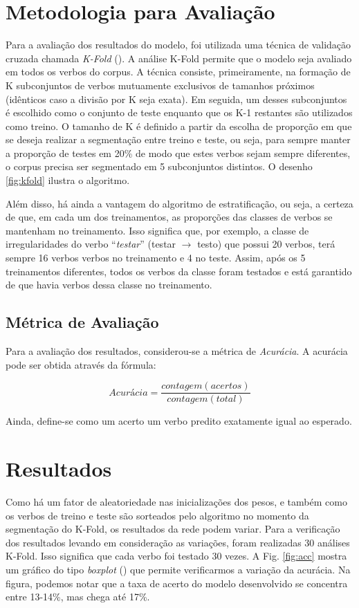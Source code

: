 \section{Metodologia para Avaliação}
\label{sec:method}

 Para a avaliação dos resultados do modelo, foi utilizada uma técnica de validação cruzada chamada \textit{K-Fold} (\cite{kfold:2018}). A análise K-Fold permite que o modelo seja avaliado em todos os verbos do corpus. A técnica consiste, primeiramente, na formação de K subconjuntos de verbos mutuamente exclusivos de tamanhos próximos (idênticos caso a divisão por K seja exata). Em seguida, um desses subconjuntos é escolhido como o conjunto de teste enquanto que os K-1 restantes são utilizados como treino. O tamanho de K é definido a partir da escolha de proporção em que se deseja realizar a segmentação entre treino e teste, ou seja, para sempre manter a proporção de testes em 20\% de modo que estes verbos sejam sempre diferentes, o corpus precisa ser segmentado em 5 subconjuntos distintos. O desenho \ref{fig:kfold} ilustra o algoritmo. 



Além disso, há ainda a vantagem do algoritmo de estratificação, ou seja, a certeza de que, em cada um dos treinamentos, as proporções das classes de verbos se mantenham no treinamento. Isso significa que, por exemplo, a classe de irregularidades do verbo “\textit{testar}” (testar $\rightarrow$ testo) que possui 20 verbos, terá sempre 16 verbos verbos no treinamento e 4 no teste. Assim, após os 5 treinamentos diferentes, todos os verbos da classe foram testados e está garantido de que havia verbos dessa classe no treinamento.

\subsection{Métrica de Avaliação}

Para a avaliação dos resultados, considerou-se a métrica de \textit{Acurácia}. A acurácia pode ser obtida através da fórmula:

\begin{equation}
    Acurácia = \frac{contagem(acertos)}{contagem(total)}
\end{equation}

Ainda, define-se como um acerto um verbo predito exatamente igual ao esperado.

\section{Resultados}
\label{sec:resultado}
Como há um fator de aleatoriedade nas inicializações dos pesos, e também como os verbos de treino e teste são sorteados pelo algoritmo no momento da segmentação do K-Fold, os resultados da rede podem variar. Para a verificação dos resultados levando em consideração as variações, foram realizadas 30 análises K-Fold. Isso significa que cada verbo foi testado 30 vezes. A Fig. \ref{fig:acc} mostra um gráfico do tipo \textit{boxplot} (\cite{2004:bussab}) que permite verificarmos a variação da acurácia. Na figura, podemos notar que a taxa de acerto do modelo desenvolvido se concentra entre 13-14\%, mas chega até 17\%.

